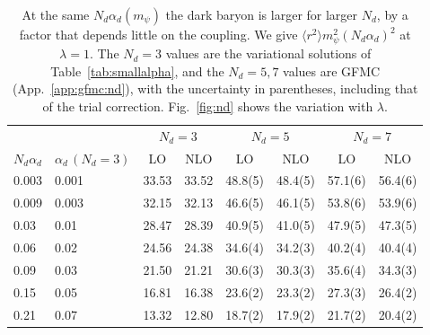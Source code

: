 \begin{table}[t]
\centering
\begin{tabular}{ll|cc|cc|cc}
\hline\hline
& & \multicolumn{2}{c|}{$N_d=3$} & \multicolumn{2}{c|}{$N_d=5$} & \multicolumn{2}{c}{$N_d=7$}\\
$N_d\alpha_d$ & $\alpha_d\,(N_d=3)$ & LO & NLO & LO & NLO & LO & NLO\\
\hline
0.003 & 0.001 & 33.53 & 33.52 & 48.8(5) & 48.4(5) & 57.1(6) & 56.4(6)\\
0.009 & 0.003 & 32.15 & 32.13 & 46.6(5) & 46.1(5) & 53.8(6) & 53.9(6)\\
0.03 & 0.01 & 28.47 & 28.39 & 40.9(5) & 41.0(5) & 47.9(5) & 47.3(5)\\
0.06 & 0.02 & 24.56 & 24.38 & 34.6(4) & 34.2(3) & 40.2(4) & 40.4(4)\\
0.09 & 0.03 & 21.50 & 21.21 & 30.6(3) & 30.3(3) & 35.6(4) & 34.3(3)\\
0.15 & 0.05 & 16.81 & 16.38 & 23.6(2) & 23.3(2) & 27.3(3) & 26.4(2)\\
0.21 & 0.07 & 13.32 & 12.80 & 18.7(2) & 17.9(2) & 21.7(2) & 20.4(2)\\
\hline\hline
\end{tabular}
\caption{At the same $N_d\alpha_d(m_\psi)$ the dark baryon is larger for larger $N_d$, by a factor that depends little on the coupling. We give $\langle r^2\rangle m_\psi^2(N_d\alpha_d)^2$ at $\lambda=1$. The $N_d=3$ values are the variational solutions of Table~\ref{tab:smallalpha}, and the $N_d=5,7$ values are GFMC (App.~\ref{app:gfmc:nd}), with the uncertainty in parentheses, including that of the trial correction. Fig.~\ref{fig:nd} shows the variation with $\lambda$.}
\label{tab:nd}
\end{table}
